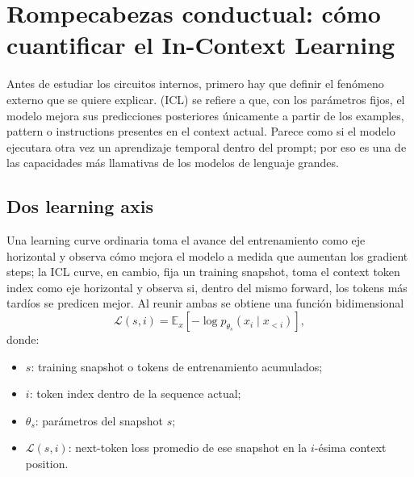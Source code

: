 \section{Rompecabezas conductual: cómo cuantificar el In-Context Learning}

Antes de estudiar los circuitos internos, primero hay que definir el fenómeno externo que se quiere explicar.  (ICL) se refiere a que, con los parámetros fijos, el modelo mejora sus predicciones posteriores únicamente a partir de los examples, pattern o instructions presentes en el context actual. Parece como si el modelo ejecutara otra vez un aprendizaje temporal dentro del prompt; por eso es una de las capacidades más llamativas de los modelos de lenguaje grandes.



\subsection{Dos learning axis}

Una learning curve ordinaria toma el avance del entrenamiento como eje horizontal y observa cómo mejora el modelo a medida que aumentan los gradient steps; la ICL curve, en cambio, fija un training snapshot, toma el context token index como eje horizontal y observa si, dentro del mismo forward, los tokens más tardíos se predicen mejor. Al reunir ambas se obtiene una función bidimensional
\[
\mathcal{L}(s,i)
=\mathbb{E}_{x}\left[-\log p_{\theta_s}(x_i\mid x_{<i})\right],
\]
donde:
\begin{itemize}
  \item $s$: training snapshot o tokens de entrenamiento acumulados;
  \item $i$: token index dentro de la sequence actual;
  \item $\theta_s$: parámetros del snapshot $s$;
  \item $\mathcal{L}(s,i)$: next-token loss promedio de ese snapshot en la $i$-ésima context position.
\end{itemize}

